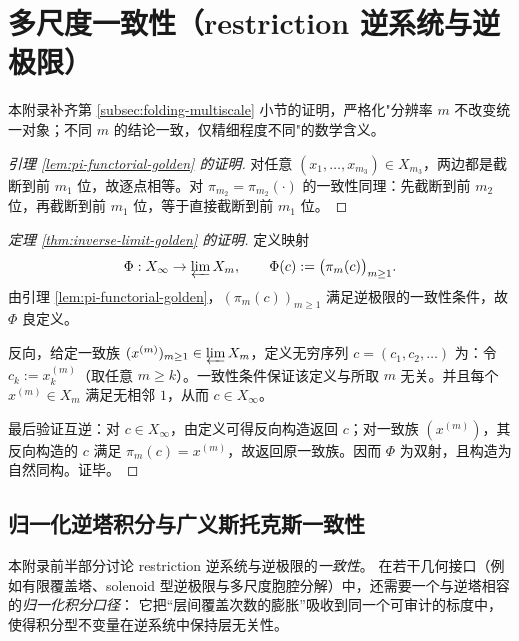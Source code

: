\section{多尺度一致性（restriction 逆系统与逆极限）}\label{app:multiscale-inverse-limit}

本附录补齐第 \ref{subsec:folding-multiscale} 小节的证明，严格化"分辨率 $m$ 不改变统一对象；不同 $m$ 的结论一致，仅精细程度不同"的数学含义。

\begin{proof}[引理 \ref{lem:pi-functorial-golden} 的证明]
对任意 $(x_1,\dots,x_{m_3})\in X_{m_3}$，两边都是截断到前 $m_1$ 位，故逐点相等。对 $\pi_{m_2}=\pi_{m_2}(\cdot)$ 的一致性同理：先截断到前 $m_2$ 位，再截断到前 $m_1$ 位，等于直接截断到前 $m_1$ 位。
\end{proof}

\begin{proof}[定理 \ref{thm:inverse-limit-golden} 的证明]
定义映射
\[
\Phi:X_\infty\to \varprojlim X_m,\qquad
\Phi(c):=\bigl(\pi_m(c)\bigr)_{m\ge 1}.
\]
由引理 \ref{lem:pi-functorial-golden}，$(\pi_m(c))_{m\ge 1}$ 满足逆极限的一致性条件，故 $\Phi$ 良定义。

反向，给定一致族 $(x^{(m)})_{m\ge 1}\in\varprojlim X_m$，定义无穷序列 $c=(c_1,c_2,\dots)$ 为：令 $c_k:=x^{(m)}_k$（取任意 $m\ge k$）。一致性条件保证该定义与所取 $m$ 无关。并且每个 $x^{(m)}\in X_m$ 满足无相邻 $1$，从而 $c\in X_\infty$。

最后验证互逆：对 $c\in X_\infty$，由定义可得反向构造返回 $c$；对一致族 $(x^{(m)})$，其反向构造的 $c$ 满足 $\pi_m(c)=x^{(m)}$，故返回原一致族。因而 $\Phi$ 为双射，且构造为自然同构。证毕。
\end{proof}

\subsection{归一化逆塔积分与广义斯托克斯一致性}\label{app:multiscale-normalized-stokes-inverse-tower}
本附录前半部分讨论 restriction 逆系统与逆极限的\emph{一致性}。
在若干几何接口（例如有限覆盖塔、solenoid 型逆极限与多尺度胞腔分解）中，还需要一个与逆塔相容的\emph{归一化积分口径}：
它把“层间覆盖次数的膨胀”吸收到同一个可审计的标度中，使得积分型不变量在逆系统中保持层无关性。

